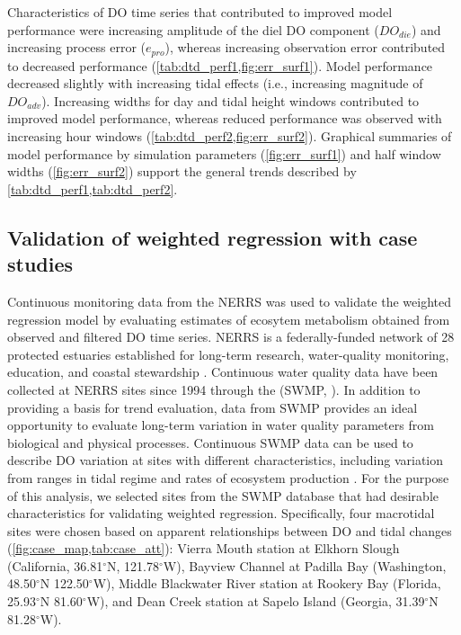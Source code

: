 \documentclass[letterpaper,12pt,oneside]{article}\usepackage[]{graphicx}\usepackage[]{color}
\begin{document}
Characteristics of \ac{DO} time series that contributed to improved model performance were increasing amplitude of the diel \ac{DO} component ($DO_{die}$) and increasing process error ($e_{pro}$), whereas increasing observation error contributed to decreased performance (\cref{tab:dtd_perf1,fig:err_surf1}).  Model performance decreased slightly with increasing tidal effects (i.e., increasing magnitude of $DO_{adv}$).  Increasing widths for day and tidal height windows contributed to improved model performance, whereas reduced performance was observed with increasing hour windows (\cref{tab:dtd_perf2,fig:err_surf2}).  Graphical summaries of model performance by simulation parameters (\cref{fig:err_surf1}) and half window widths (\cref{fig:err_surf2}) support the general trends described by \cref{tab:dtd_perf1,tab:dtd_perf2}.

\subsection{Validation of weighted regression with case studies}

Continuous monitoring data from the \acl{NERRS} was used to validate the weighted regression model by evaluating estimates of ecosytem metabolism obtained from observed and filtered \ac{DO} time series. \ac{NERRS} is a federally-funded network of 28 protected estuaries established for long-term research, water-quality monitoring, education, and coastal stewardship \citep{Wenner04}.  Continuous water quality data have been collected at \ac{NERRS} sites since 1994 through the  (\acs{SWMP}, ).  In addition to providing a basis for trend evaluation, data from \ac{SWMP} provides an ideal opportunity to evaluate long-term variation in water quality parameters from biological and physical processes.  Continuous \ac{SWMP} data can be used to describe \ac{DO} variation at sites with different characteristics, including variation from ranges in tidal regime \citep{Sanger02} and rates of ecosystem production \citep{Caffrey03,Caffrey04}.  For the purpose of this analysis, we selected sites from the \ac{SWMP} database that had desirable characteristics for validating weighted regression.  Specifically, four macrotidal sites were chosen based on apparent relationships between \ac{DO} and tidal changes (\cref{fig:case_map,tab:case_att}): Vierra Mouth station at Elkhorn Slough (California, 36.81$^{\circ}$N, 121.78$^{\circ}$W), Bayview Channel at Padilla Bay (Washington, 48.50$^{\circ}$N 122.50$^{\circ}$W), Middle Blackwater River station at Rookery Bay (Florida, 25.93$^{\circ}$N 81.60$^{\circ}$W), and Dean Creek station at Sapelo Island (Georgia, 31.39$^{\circ}$N 81.28$^{\circ}$W).   
\end{document}
